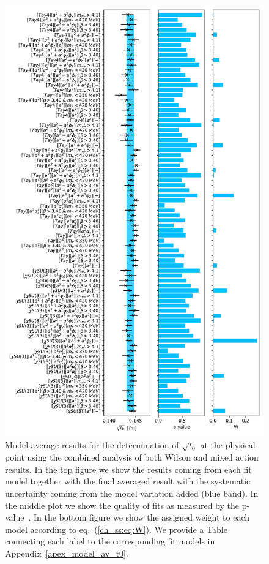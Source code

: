 \begin{figure}
    \centering
    \includegraphics[width=1.\textwidth]{./cap5/figs/BMA_comb.pdf}
    \caption{Model average results for the determination of $\sqrt{t_0}$ at the physical point using the combined analysis of both Wilson and mixed action results. In the top figure we show the results coming from each fit model together with the final averaged result with the systematic uncertainty coming from the model variation added (blue band). In the middle plot we show the quality of fits as measured by the p-value~\cite{chi_exp}. In the bottom figure we show the assigned weight to each model according to eq.~(\ref{ch_ss:eq:W}). We provide a Table connecting each label to the corresponding fit models in Appendix~\ref{apex_model_av_t0}.}
    \label{ch_ss:fig:BMA_comb}
\end{figure}

